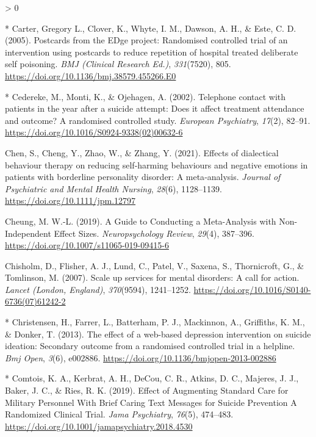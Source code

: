 \documentclass[
  english,
  man]{apa6}
\newlength{\cslhangindent}
\newenvironment{CSLReferences}[2] %
 {%
  \setlength{\parindent}{0pt}
  \ifodd #1 \everypar{\setlength{\hangindent}{\cslhangindent}}\ignorespaces\fi
  \ifnum #2 > 0
  \setlength{\parskip}{#2\baselineskip}
  \fi
 }%
 {}
\begin{document}
\begin{CSLReferences}{1}{0}
\leavevmode\hypertarget{ref-carter2005}{}%
* Carter, Gregory L., Clover, K., Whyte, I. M., Dawson, A. H., \& Este, C. D. (2005). Postcards from the {EDge} project: Randomised controlled trial of an intervention using postcards to reduce repetition of hospital treated deliberate self poisoning. \emph{BMJ (Clinical Research Ed.)}, \emph{331}(7520), 805. \url{https://doi.org/10.1136/bmj.38579.455266.E0}

\leavevmode\hypertarget{ref-cedereke2002}{}%
* Cedereke, M., Monti, K., \& Ojehagen, A. (2002). Telephone contact with patients in the year after a suicide attempt: Does it affect treatment attendance and outcome? A randomised controlled study. \emph{European Psychiatry}, \emph{17}(2), 82--91. \url{https://doi.org/10.1016/S0924-9338(02)00632-6}

\leavevmode\hypertarget{ref-chen2021}{}%
Chen, S., Cheng, Y., Zhao, W., \& Zhang, Y. (2021). Effects of dialectical behaviour therapy on reducing self‐harming behaviours and negative emotions in patients with borderline personality disorder: A meta‐analysis. \emph{Journal of Psychiatric and Mental Health Nursing}, \emph{28}(6), 1128--1139. \url{https://doi.org/10.1111/jpm.12797}

\leavevmode\hypertarget{ref-cheung2019}{}%
Cheung, M. W.-L. (2019). A {Guide} to {Conducting} a {Meta}-{Analysis} with {Non}-{Independent Effect Sizes}. \emph{Neuropsychology Review}, \emph{29}(4), 387--396. \url{https://doi.org/10.1007/s11065-019-09415-6}

\leavevmode\hypertarget{ref-chisholm2007}{}%
Chisholm, D., Flisher, A. J., Lund, C., Patel, V., Saxena, S., Thornicroft, G., \& Tomlinson, M. (2007). Scale up services for mental disorders: A call for action. \emph{Lancet (London, England)}, \emph{370}(9594), 1241--1252. \url{https://doi.org/10.1016/S0140-6736(07)61242-2}

\leavevmode\hypertarget{ref-christensen2013}{}%
* Christensen, H., Farrer, L., Batterham, P. J., Mackinnon, A., Griffiths, K. M., \& Donker, T. (2013). The effect of a web-based depression intervention on suicide ideation: Secondary outcome from a randomised controlled trial in a helpline. \emph{Bmj Open}, \emph{3}(6), e002886. \url{https://doi.org/10.1136/bmjopen-2013-002886}

\leavevmode\hypertarget{ref-comtois2019}{}%
* Comtois, K. A., Kerbrat, A. H., DeCou, C. R., Atkins, D. C., Majeres, J. J., Baker, J. C., \& Ries, R. K. (2019). Effect of {Augmenting Standard Care} for {Military Personnel With Brief Caring Text Messages} for {Suicide Prevention A Randomized Clinical Trial}. \emph{Jama Psychiatry}, \emph{76}(5), 474--483. \url{https://doi.org/10.1001/jamapsychiatry.2018.4530}


\end{CSLReferences}
\end{document}
